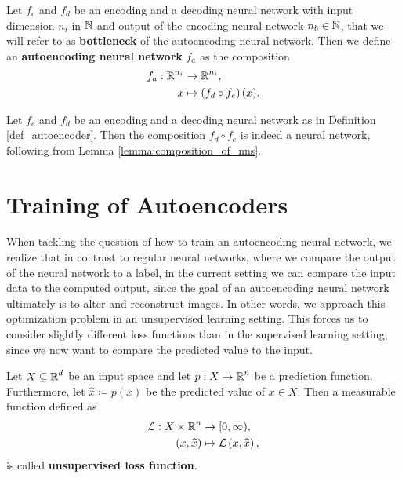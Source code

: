 \begin{definition}\label{def_autoencoder}
Let $f_e$ and $f_d$ be an encoding and a decoding neural network with input dimension $n_i$ in $\operatorname{\mathbb{N}}$ and output of the encoding neural network $n_b \in \operatorname{\mathbb{N}}$, that we will refer to as \textbf{bottleneck} of the autoencoding neural network.
Then we define an \textbf{autoencoding neural network} $f_a$ as the composition
\begin{align*}
f_a: \operatorname{\mathbb{R}}^{n_i} &\to \operatorname{\mathbb{R}}^{n_i},\\
x &\mapsto \left(f_d \circ f_e \right)(x).
\end{align*}
\end{definition}

\begin{remark}
Let $f_e$ and $f_d$ be an encoding and a decoding neural network as in Definition \ref{def_autoencoder}. Then the composition $f_d \circ f_e$ is indeed a neural network, following from Lemma \ref{lemma:composition_of_nns}.
\end{remark}


\section{Training of Autoencoders}
When tackling the question of how to train an autoencoding neural network, we realize that in contrast to regular neural networks, where we compare the output of the neural network to a label, in the current setting we can compare the input data to the computed output, since the goal of an autoencoding neural network ultimately is to alter and reconstruct images. In other words, we approach this optimization problem in an unsupervised learning setting. This forces us to consider slightly different loss functions than in the supervised learning setting, since we now want to compare the predicted value to the input.


\begin{definition}
Let $X\subseteq \operatorname{\mathbb{R}}^{d}$ be an input space and let $p:X\to \operatorname{\mathbb{R}}^{n}$ be a prediction function. Furthermore, let $\hat{x}\coloneqq p(x)$ be the predicted value of $x\in X$. Then a measurable function defined as
\begin{align*}
\operatorname{\mathcal{L}}:X \times \operatorname{\mathbb{R}}^{n} &\to [0, \infty),\\
\left(x, \widehat{x}\right) &\mapsto \operatorname{\mathcal{L}}\left(x, \widehat{x}\right),
\end{align*}
is called \textbf{unsupervised loss function}.
\end{definition}


